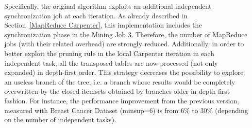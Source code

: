 Specifically, the original algorithm
exploits an additional independent
synchronization job at each iteration. As already described in
Section~\ref{MapReduce Carpenter}, this implementation includes the
synchronization phase in the Mining Job 3. Therefore, the number of MapReduce
jobs (with their related overhead) are strongly reduced.
Additionally, in order to better exploit the pruning rule in the local Carpenter
iteration in each independent task, all the transposed tables are now processed
(not only expanded) in depth-first order. This strategy decreases the
possibility to explore an useless branch of the tree, i.e. a branch whose
results would be completely overwritten by the closed itemsets obtained by
branches older in depth-first fashion. For instance, the performance improvement from the previous version, measured with Breast Cancer Dataset (minsup=6) is from 6\% to 30\% (depending on the number of independent tasks).
%
